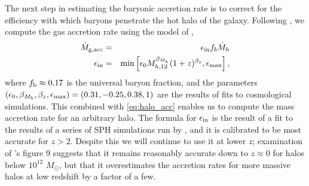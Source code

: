 \documentclass[useAMS,usenatbib]{mn2e}
\begin{document}
The next step in estimating the baryonic accretion rate is to correct for the efficiency with which baryons penetrate the hot halo of the galaxy. Following \citet{forbes14a}, we compute the gas accretion rate using the model of \citet{faucher-giguere11a},
\begin{eqnarray}
\label{eq:gas_acc}
\dot{M}_{\rm g,acc} & = & \epsilon_{\rm in} f_b \dot{M}_{h} \\
\epsilon_{\rm in} & = & \min\left[\epsilon_0 M_{h,12}^{\beta_{M_h}}(1+z)^{\beta_z}, \epsilon_{\rm max}\right],
\end{eqnarray}
where $f_{\rm b}\approx 0.17$ is the universal baryon fraction, and the parameters $\left(\epsilon_0, \beta_{M_{\rm h}}, \beta_z, \epsilon_{\rm max}\right) = (0.31, -0.25, 0.38, 1)$ are the results of fits to cosmological simulations. This combined with \autoref{eq:halo_acc} enables us to compute the mass accretion rate for an arbitrary halo. The formula for $\epsilon_{\rm in}$ is the result of a fit to the results of a series of SPH simulations run by \citet{faucher-giguere11a}, and it is calibrated to be most accurate for $z > 2$. Despite this we will continue to use it at lower $z$; examination of \citeauthor{faucher-giguere11a}'s figure 9 suggests that it remains reasonably accurate down to $z \approx 0$ for halos below $10^{12}$ $M_\odot$, but that it overestimates the accretion rates for more massive halos at low redshift by a factor of a few.
\end{document}
